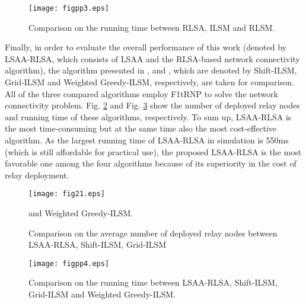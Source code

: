 \documentclass[journal]{IEEEtran}
\begin{document}
\begin{figure}
\begin{center}
\texttt{[image: figpp3.eps]}    \caption{Comparison on the running time between RLSA, ILSM and RLSM.}
\label{figpp3}                                 \end{center}                                 \end{figure}

Finally, in order to evaluate the overall performance of this work (denoted by LSAA-RLSA, which consists of LSAA and the RLSA-based network connectivity algorithm), the algorithm presented in \cite{Tang06}, \cite{Franceschetti01} and \cite{Ali11}, which are denoted by Shift-ILSM,
Grid-ILSM and Weighted Greedy-ILSM, respectively, are taken for comparison. All of the three compared algorithms employ F1tRNP \cite{Lloyd07} to solve the network connectivity problem. Fig. \ref{fig21} and Fig. \ref{figpp4} show the number of deployed relay nodes and running time of these algorithms, respectively. To sum up, LSAA-RLSA is the most time-consuming but at the same time also the most cost-effective algorithm. As the largest running time of LSAA-RLSA in simulation is 550ms (which is still affordable for practical use), the proposed LSAA-RLSA is the most favorable one among the four algorithms because of its superiority in the cost of relay deployment.

\begin{figure}
\begin{center}
\texttt{[image: fig21.eps]}    \caption{Comparison on the average number of deployed relay nodes between LSAA-RLSA, Shift-ILSM, Grid-ILSM} and Weighted Greedy-ILSM.
\label{fig21}                                 \end{center}                                 \end{figure}

\begin{figure}
\begin{center}
\texttt{[image: figpp4.eps]}    \caption{Comparison on the running time between LSAA-RLSA, Shift-ILSM, Grid-ILSM and Weighted Greedy-ILSM.}
\label{figpp4}                                 \end{center}                                 \end{figure}
\end{document}
